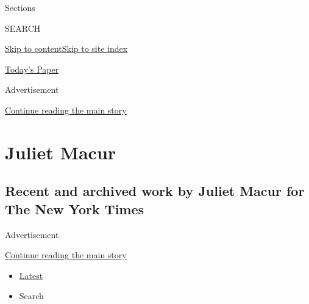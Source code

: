 Sections

SEARCH

\protect\hyperlink{site-content}{Skip to
content}\protect\hyperlink{site-index}{Skip to site index}

\href{https://myaccount.nytimes.com/auth/login?response_type=cookie\&client_id=vi}{}

\href{https://www.nytimes.com/section/todayspaper}{Today's Paper}

Advertisement

\protect\hyperlink{after-top}{Continue reading the main story}

\hypertarget{juliet-macur}{%
\section{Juliet Macur}\label{juliet-macur}}

\hypertarget{recent-and-archived-work-by-juliet-macur-for-the-new-york-times}{%
\subsection{Recent and archived work by Juliet Macur for The New York
Times}\label{recent-and-archived-work-by-juliet-macur-for-the-new-york-times}}

Advertisement

\protect\hyperlink{after-mid1}{Continue reading the main story}

\begin{itemize}
\tightlist
\item
  \protect\hyperlink{stream-panel}{Latest}
\item
  Search
\end{itemize}

